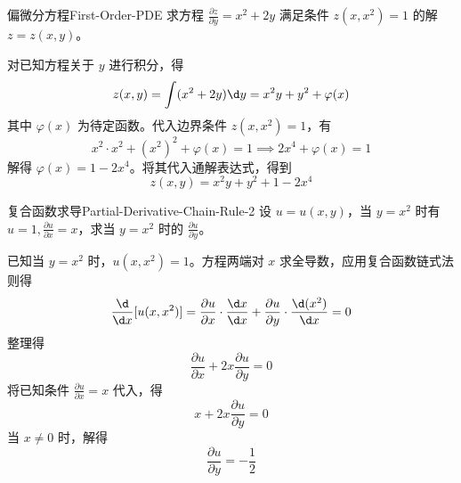 \begin{problem}{偏微分方程}{First-Order-PDE}
    求方程 $\frac{\partial z}{\partial y} = x^2 + 2y$ 满足条件 $z(x, x^2) = 1$ 的解 $z = z(x, y)$。
\end{problem}

\begin{solution}
    对已知方程关于 $y$ 进行积分，得
    \begin{equation}
        z(x, y) = \int (x^2 + 2y) \d y = x^2 y + y^2 + \varphi(x)
    \end{equation}
    其中 $\varphi(x)$ 为待定函数。代入边界条件 $z(x, x^2) = 1$，有
    \begin{equation}
        x^2 \cdot x^2 + (x^2)^2 + \varphi(x) = 1 \implies 2x^4 + \varphi(x) = 1
    \end{equation}
    解得 $\varphi(x) = 1 - 2x^4$。将其代入通解表达式，得到
    \begin{equation}
        \boxed{z(x, y) = x^2 y + y^2 + 1 - 2x^4}
    \end{equation}
\end{solution}


\begin{problem}{复合函数求导}{Partial-Derivative-Chain-Rule-2}
    设 $u = u(x, y)$，当 $y = x^2$ 时有 $u = 1, \frac{\partial u}{\partial x} = x$，求当 $y = x^2$ 时的 $\frac{\partial u}{\partial y}$。
\end{problem}

\begin{solution}
    已知当 $y = x^2$ 时，$u(x, x^2) = 1$。方程两端对 $x$ 求全导数，应用复合函数链式法则得
    \begin{equation}
        \frac{\d}{\d x} [u(x, x^2)] = \frac{\partial u}{\partial x} \cdot \frac{\d x}{\d x} + \frac{\partial u}{\partial y} \cdot \frac{\d (x^2)}{\d x} = 0
    \end{equation}
    整理得
    \begin{equation}
        \frac{\partial u}{\partial x} + 2x \frac{\partial u}{\partial y} = 0
    \end{equation}
    将已知条件 $\frac{\partial u}{\partial x} = x$ 代入，得
    \begin{equation}
        x + 2x \frac{\partial u}{\partial y} = 0
    \end{equation}
    当 $x \neq 0$ 时，解得
    \begin{equation}
        \boxed{\frac{\partial u}{\partial y} = -\frac{1}{2}}
    \end{equation}
\end{solution}


